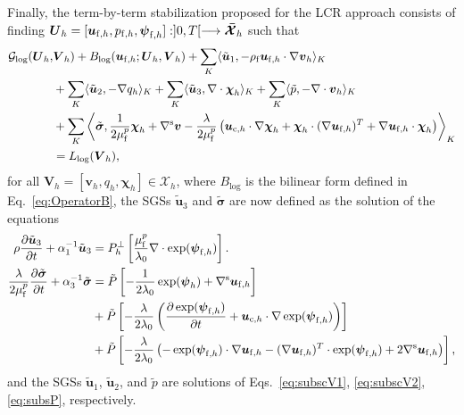 \documentclass[11pt,english]{article}
\def\ufluidh{\boldsymbol{u}_{{\rm{f}},h}}
\def\pfluidh{p_{{\rm{f}},h}}
\def\psifluidh{\boldsymbol{\psi}_{{\rm{f}},h}}
\def\viscp{\mu^{p}_{\rm{f}}}
\def\alevelocityh{\boldsymbol{u}_{\mathrm{c},h}}
\begin{document}
Finally, the term-by-term stabilization proposed for the LCR approach consists of finding $\boldsymbol{U}_{h}=[\ufluidh,\pfluidh,\psifluidh]:]0,T[\longrightarrow\boldsymbol{\mathcal{\bar{X}}}_{h}$ such that 
\begin{align*}
    \mathcal{G}_{\text{log}}(\boldsymbol{U}_{h}, & \boldsymbol{V}_{h})+B_{\text{log}}(\ufluidh;\boldsymbol{U}_{h},\boldsymbol{V}_{h})+\sum_{K}\langle\tilde{\boldsymbol{u}}_{1},-\rho_{\rm{f}}\ufluidh\cdot\nabla\boldsymbol{v}_{h}\rangle_{K}\\
     & +\sum_{K}\langle\tilde{\boldsymbol{u}}_{2},-\nabla q_{h}\rangle_{K}+\sum_{K}\langle\tilde{\boldsymbol{u}}_{3},\nabla\cdot\boldsymbol{\chi}_{h}\rangle_{K}+\sum_{K}\langle\tilde{p},-\nabla\cdot\boldsymbol{v}_{h}\rangle_{K}\\
     & +\sum_{K}\left\langle \tilde{\boldsymbol{\sigma}},\dfrac{1}{2\viscp}\boldsymbol{\chi}_{h}+\nabla^{\rm s}\boldsymbol{v}-\dfrac{\lambda}{2\viscp}\left(\alevelocityh\cdot\nabla\boldsymbol{\chi}_{h}+\boldsymbol{\chi}_{h}\cdot(\nabla\ufluidh)^{T}+\nabla\ufluidh\cdot\boldsymbol{\chi}_{h}\right)\right\rangle _{K}\\
     & = L_{\rm log}(\boldsymbol{V}_{h}),
\end{align*}
for all $\boldsymbol{V}_{h}=[\boldsymbol{v}_{h},q_{h},\boldsymbol{\chi}_{h}]\in\boldsymbol{\mathcal{{X}}}_{h}$, where $B_{\log}$ is the bilinear form defined in Eq.~\eqref{eq:OperatorB}, the SGSs $\tilde{\boldsymbol{u}}_{3}$ and $\tilde{\boldsymbol{\sigma}}$ are now defined as the solution of the equations 
\begin{align*}
    \rho\frac{\partial\tilde{\boldsymbol{u}}_{3}}{\partial t}+\alpha_{\text{1}}^{-1}\tilde{\boldsymbol{u}}_{3} & =P_{h}^{\bot}\left[\dfrac{\viscp}{\lambda_{0}}\nabla\cdot\exp(\psifluidh)\right].\\ %
    \dfrac{\lambda}{2\viscp}\dfrac{\partial\tilde{\boldsymbol{\sigma}}}{\partial t}+\alpha_{3}^{-1}\tilde{\boldsymbol{\sigma}} & =\tilde{P}\left[-\dfrac{1}{2\lambda_{0}}\exp(\boldsymbol{\psi}_{h})+\nabla^{\rm s}\ufluidh\right]\\ %
     & +\tilde{P}\left[-\dfrac{\lambda}{2\lambda_{0}}\left(\dfrac{\partial\exp(\psifluidh)}{\partial t}+\alevelocityh\cdot\nabla\exp(\psifluidh)\right)\right]\\ %
     & +\tilde{P}\left[-\dfrac{\lambda}{2\lambda_{0}}\left(-\exp(\psifluidh)\cdot\nabla\ufluidh-(\nabla\ufluidh)^{T}\cdot\exp(\psifluidh)+2\nabla^{\rm s}\ufluidh\right)\right],%
\end{align*}
and the SGSs $\tilde{\boldsymbol{u}}_{1}$, $\tilde{\boldsymbol{u}}_{2}$, and $\tilde{p}$ are solutions of Eqs.~\eqref{eq:subscV1}, \eqref{eq:subscV2}, \eqref{eq:subsP}, respectively.
\end{document}
